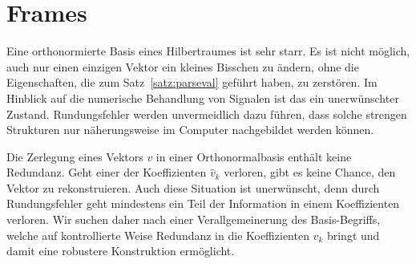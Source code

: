 %
%
%
\section{Frames
\label{section:frames}}
Eine orthonormierte Basis eines Hilbertraumes ist sehr starr.
Es ist nicht möglich, auch nur einen einzigen Vektor ein kleines
Bisschen zu ändern, ohne die Eigenschaften, die zum Satz~\ref{satz:parseval}
geführt haben, zu zerstören.
Im Hinblick auf die numerische Behandlung von Signalen ist das
ein unerwünschter Zustand.
Rundungsfehler werden unvermeidlich dazu führen, dass solche strengen
Strukturen nur näherungsweise im Computer nachgebildet werden 
können.

Die Zerlegung eines Vektors $v$ in einer Orthonormalbasis enthält keine
Redundanz.
Geht einer der Koeffizienten $\hat{v}_k$ verloren, gibt es keine
Chance, den Vektor zu rekonstruieren.
Auch diese Situation ist unerwünscht, denn durch Rundungsfehler geht
mindestens ein Teil der Information in einem Koeffizienten verloren.
Wir suchen daher nach einer Verallgemeinerung des Basis-Begriffs, welche
auf kontrollierte Weise Redundanz in die Koeffizienten $\hat{v}_k$
bringt und damit eine robustere Konstruktion ermöglicht.

